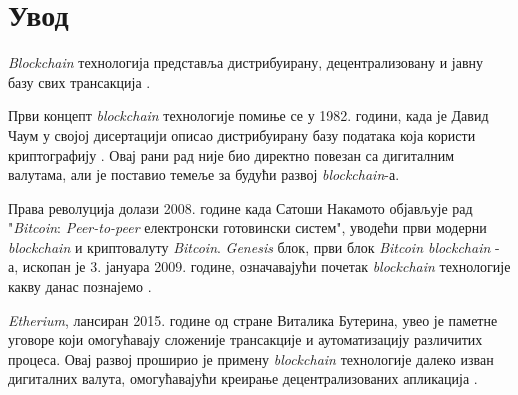 \documentclass[12pt, a4paper]{article}
\begin{document}




\renewcommand{\contentsname}{Садржај} %
\tableofcontents %
\clearpage %
\setcounter{page}{3}
\pagestyle{fancy}
\fancyhf{} %
\fancyfoot[R]{\thepage} %
\renewcommand{\headrule}{} %

\section{Увод}
\textit{Blockchain} технологија представља дистрибуирану, децентрализовану и јавну базу свих трансакција \cite{1}.


Први концепт \textit{blockchain} технологије помиње се у 1982. години, када је Давид Чаум у својој дисертацији описао дистрибуирану базу података која користи криптографију \cite{2}. Овај рани рад није био директно повезан са дигиталним валутама, али је поставио темеље за будући развој \textit{blockchain}-а.

Права револуција долази 2008. године када Сатоши Накамото објављује рад "\textit{Bitcoin}: \textit{Peer-to-peer} електронски готовински систем", уводећи први модерни \textit{blockchain} и криптовалуту \textit{Bitcoin}. \textit{Genesis} блок, први блок \textit{Bitcoin blockchain} - а, ископан је 3. јануара 2009. године, означавајући почетак \textit{blockchain} технологије какву данас познајемо \cite{3}.

\textit{Etherium}, лансиран 2015. године од стране Виталика Бутерина, увео је паметне уговоре који омогућавају сложеније трансакције и аутоматизацију различитих процеса. Овај развој проширио је примену \textit{blockchain} технологије далеко изван дигиталних валута, омогућавајући креирање децентрализованих апликација \cite{4}.
\end{document}
